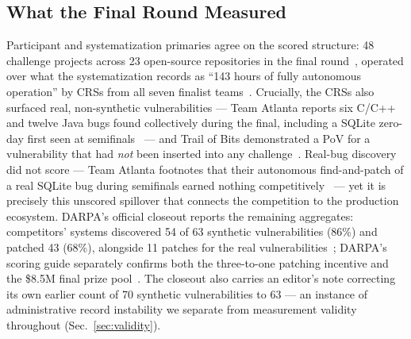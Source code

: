 \subsection{What the Final Round Measured}
Participant and systematization primaries agree on the scored structure: 48 challenge projects
across 23 open-source repositories in the final round~\cite{tobbuttercup2025}, operated over
what the systematization records as ``143 hours of fully autonomous operation'' by CRSs from
all seven finalist teams~\cite{r7sokaixcc2026}. Crucially, the CRSs also surfaced real,
non-synthetic vulnerabilities --- Team Atlanta reports six C/C++ and twelve Java bugs found
collectively during the final, including a SQLite zero-day first seen at
semifinals~\cite{taafc2025} --- and Trail of Bits demonstrated a PoV for a vulnerability that
had \emph{not} been inserted into any challenge~\cite{tobbuttercup2025}. Real-bug discovery did
not score --- Team Atlanta footnotes that their autonomous find-and-patch of a real SQLite bug
during semifinals earned nothing competitively~\cite{taasc2024} --- yet it is precisely this
unscored spillover that connects the competition to the production ecosystem. DARPA's official
closeout reports the remaining aggregates: competitors' systems discovered 54 of 63 synthetic
vulnerabilities (86\%) and patched 43 (68\%), alongside 11 patches for the real
vulnerabilities~\cite{darparesults2025}; DARPA's scoring guide separately confirms both the
three-to-one patching incentive and the \$8.5M final prize pool~\cite{darpascoring2025}. The
closeout also carries an editor's note correcting its own earlier count of 70 synthetic
vulnerabilities to 63 --- an instance of administrative record instability we separate from
measurement validity throughout (Sec.~\ref{sec:validity}).

